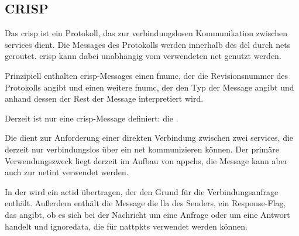 \subsection{CRISP}
\label{dcl-crisp}
Das \acrfull{crisp} ist ein Protokoll, das zur verbindungslosen Kommunikation
zwischen \glspl{service} dient.
Die Messages des Protokolls werden innerhalb des \gls{dcl} durch \glspl{net}
geroutet.
\acrshort{crisp} kann dabei unabhängig vom verwendeten \gls{net} genutzt werden.

Prinzipiell enthalten \acrshort{crisp}-Messages einen \gls{fnumc}, der die
Revisionsnummer des Protokolls angibt und einen weitere \gls{fnumc}, der den
Typ der Message angibt und anhand dessen der Rest der Message interpretiert
wird.

\crispbytefield

\label{dcl-crisp-neighreq}
Derzeit ist nur eine \acrshort{crisp}-Message definiert: die
\msg{\crispneighreq}.

Die \msg{\crispneighreq} dient zur Anforderung einer direkten Verbindung
zwischen zwei \glspl{service}, die derzeit nur verbindungslos über ein \gls{net}
kommunizieren können. Der primäre Verwendungszweck liegt derzeit im Aufbau von
\glspl{appch}, die Message kann aber auch zur \gls{netint} verwendet werden.

In der \msg{\crispneighreq} wird ein \gls{actid} übertragen, der den Grund für
die Verbindungsanfrage enthält.
Außerdem enthält die Message die \gls{lla} des Senders, ein Response-Flag,
das angibt, ob es sich bei der Nachricht um eine Anfrage oder um eine Antwort
handelt und \gls{ignoredata}, die für \glspl{nattpkt} verwendet werden können.

\crispneighreqbytefield


